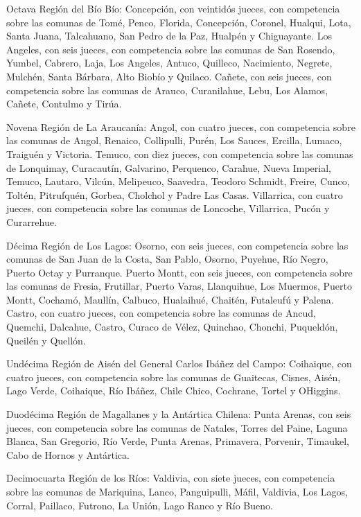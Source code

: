     Octava Región del Bío Bío:
    Concepción, con veintidós jueces, con competencia sobre las comunas de Tomé, Penco, Florida, Concepción, Coronel, Hualqui, Lota, Santa Juana, Talcahuano, San Pedro de la Paz, Hualpén y Chiguayante.
    Los Angeles, con seis jueces, con competencia sobre las comunas de San Rosendo, Yumbel, Cabrero, Laja, Los Angeles, Antuco, Quilleco, Nacimiento, Negrete, Mulchén, Santa Bárbara, Alto Biobío y Quilaco.
    Cañete, con seis jueces, con competencia sobre las comunas de Arauco, Curanilahue, Lebu, Los Alamos, Cañete, Contulmo y Tirúa.

    Novena Región de La Araucanía:
    Angol, con cuatro jueces, con competencia sobre las comunas de Angol, Renaico, Collipulli, Purén, Los Sauces, Ercilla, Lumaco, Traiguén y Victoria.
    Temuco, con diez jueces, con competencia sobre las comunas de Lonquimay, Curacautín, Galvarino, Perquenco, Carahue, Nueva Imperial, Temuco, Lautaro, Vilcún, Melipeuco, Saavedra, Teodoro Schmidt, Freire, Cunco, Toltén, Pitrufquén, Gorbea, Cholchol y Padre Las Casas.
    Villarrica, con cuatro jueces, con competencia sobre las comunas de Loncoche, Villarrica, Pucón y Curarrehue.

    Décima Región de Los Lagos:
    Osorno, con seis jueces, con competencia sobre las comunas de San Juan de la Costa, San Pablo, Osorno, Puyehue, Río Negro, Puerto Octay y Purranque.
    Puerto Montt, con seis jueces, con competencia sobre las comunas de Fresia, Frutillar, Puerto Varas, Llanquihue, Los Muermos, Puerto Montt, Cochamó, Maullín, Calbuco, Hualaihué, Chaitén, Futaleufú y Palena.
    Castro, con cuatro jueces, con competencia sobre las comunas de Ancud, Quemchi, Dalcahue, Castro, Curaco de Vélez, Quinchao, Chonchi, Puqueldón, Queilén y Quellón.

    Undécima Región de Aisén del General Carlos Ibáñez del Campo:
    Coihaique, con cuatro jueces, con competencia sobre las comunas de Guaitecas, Cisnes, Aisén, Lago Verde, Coihaique, Río Ibáñez, Chile Chico, Cochrane, Tortel y OHiggins.

    Duodécima Región de Magallanes y la Antártica Chilena:
    Punta Arenas, con seis jueces, con competencia sobre las comunas de Natales, Torres del Paine, Laguna Blanca, San Gregorio, Río Verde, Punta Arenas, Primavera, Porvenir, Timaukel, Cabo de Hornos y Antártica.

    Decimocuarta Región de los Ríos:
    Valdivia, con siete jueces, con competencia sobre las comunas de Mariquina, Lanco, Panguipulli, Máfil, Valdivia, Los Lagos, Corral, Paillaco, Futrono, La Unión, Lago Ranco y Río Bueno.

